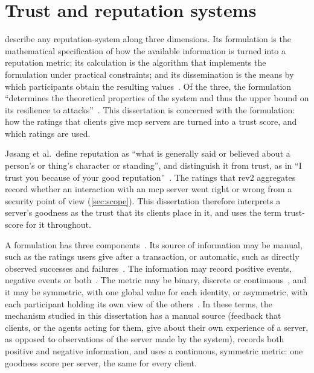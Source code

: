 \section{Trust and reputation systems}\label{sec:trust-reputation}

\textcite{Hoffman2009} describe any \gls{reputation-system} along three dimensions. Its formulation is the mathematical specification of how the available information is turned into a reputation metric; its calculation is the algorithm that implements the formulation under practical constraints; and its dissemination is the means by which participants obtain the resulting values~\cite[p.~1:4]{Hoffman2009}. Of the three, the formulation \enquote{determines the theoretical properties of the system and thus the upper bound on its resilience to attacks}~\cite[p.~1:5]{Hoffman2009}. This dissertation is concerned with the formulation: how the ratings that clients give \gls{mcp} servers are turned into a trust score, and which ratings are used.

Jøsang et al.\ define \gls{reputation} as \enquote{what is generally said or believed about a person's or thing's character or standing}, and distinguish it from \gls{trust}, as in \enquote{I trust you because of your good reputation}~\cite[p.~620]{Jsang2007}. The ratings that \gls{rev2} aggregates record whether an interaction with an \gls{mcp} server went right or wrong from a security point of view (\cref{sec:scope}). This dissertation therefore interprets a server's \gls{goodness} as the trust that its clients place in it, and uses the term \gls{trust-score} for it throughout.

A formulation has three components~\cite[p.~1:5]{Hoffman2009}. Its source of information may be manual, such as the ratings users give after a transaction, or automatic, such as directly observed successes and failures~\cite[pp.~1:5, 1:7]{Hoffman2009}. The information may record positive events, negative events or both~\cite[p.~1:7]{Hoffman2009}. The metric may be binary, discrete or continuous~\cite[p.~1:7]{Hoffman2009}, and it may be symmetric, with one global value for each identity, or asymmetric, with each participant holding its own view of the others~\cite[p.~1:8]{Hoffman2009}. In these terms, the mechanism studied in this dissertation has a manual source (feedback that clients, or the agents acting for them, give about their own experience of a server, as opposed to observations of the server made by the system), records both positive and negative information, and uses a continuous, symmetric metric: one goodness score per server, the same for every client.

